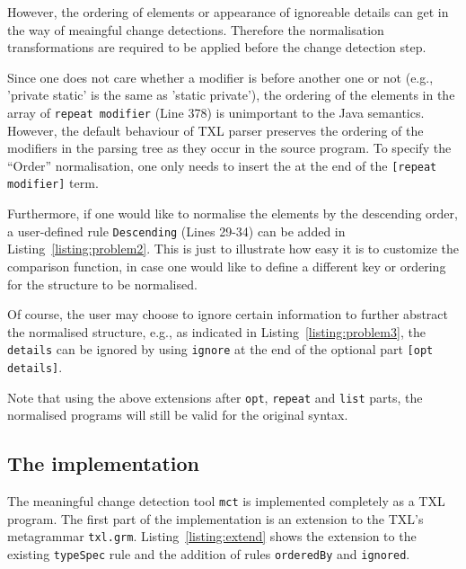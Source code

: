 \documentclass[10pt, conference, compsocconf]{IEEEtran}
\begin{document}
However, the ordering of elements or appearance of ignoreable details can get in the way of meaingful change detections. Therefore the normalisation transformations are required to be applied before the change detection step. 

Since one does not care whether a modifier is before another one or not (e.g., 'private static' is the same as 'static private'), the ordering of the elements in the array of {\tt repeat modifier}  (Line 378) is unimportant to the Java semantics. However, the default behaviour of TXL parser preserves the ordering of the modifiers in the parsing tree as they occur in the source program. To specify the ``Order'' normalisation, one only needs to insert the  at the end of the {\tt [repeat modifier]} term.

Furthermore, if one would like to normalise the elements by the descending order, a user-defined rule {\tt Descending} (Lines 29-34) can be added in Listing~\ref{listing:problem2}. This is just to illustrate how easy it is to customize the comparison function, in case one would like to define a different key or ordering for the structure to be normalised.

Of course, the user may choose to ignore certain information to further abstract the normalised structure, e.g., as indicated in Listing~\ref{listing:problem3}, the {\tt details} can be ignored by using {\tt ignore} at the end of the optional part {\tt [opt details]}. 

Note that using the above extensions after {\tt opt}, {\tt repeat} and {\tt list} parts, the normalised programs will still be valid for the original syntax.

\subsection{The implementation}
The meaningful change detection tool {\tt mct} is implemented completely as a TXL program. The first part of the implementation is an extension to the TXL's metagrammar {\tt txl.grm}. Listing~\ref{listing:extend} shows the extension to the existing {\tt typeSpec} rule and the addition of rules {\tt orderedBy} and {\tt ignored}.

 
\end{document}
